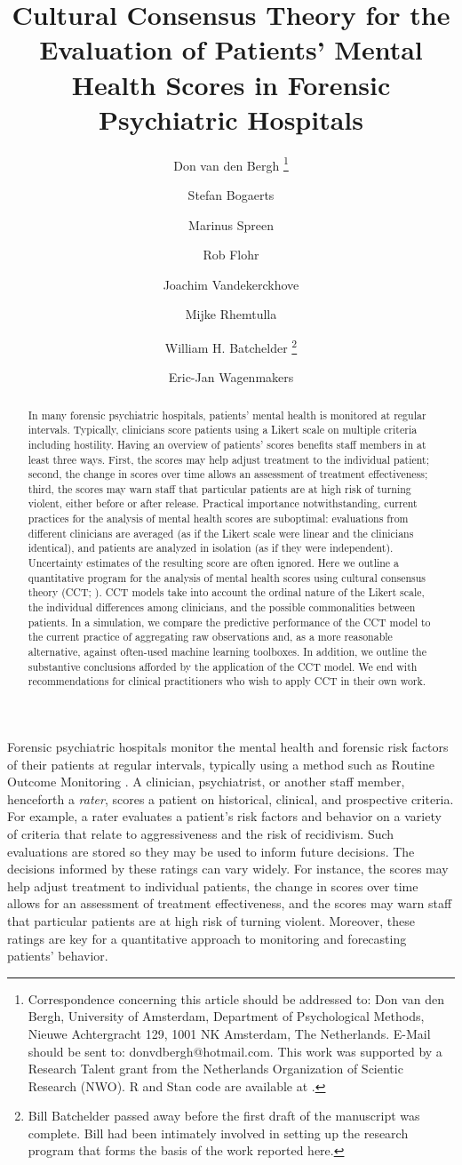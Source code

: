 \documentclass[a4paper,usenames,dvipsnames]{article}
\title{Cultural Consensus Theory for the Evaluation of Patients' Mental Health Scores in Forensic Psychiatric Hospitals}
\author[1]{Don van den Bergh%
\thanks{Correspondence concerning this article should be addressed to: Don van den Bergh, University of Amsterdam, Department of Psychological Methods, Nieuwe Achtergracht 129, 1001 NK Amsterdam, The Netherlands. E-Mail should be sent to: donvdbergh@hotmail.com. This work was supported by a Research Talent grant from the Netherlands Organization of Scientic Research (NWO). R and Stan code are available at \osflink{}.
}}
\author[2]{Stefan Bogaerts}
\author[3]{Marinus Spreen}
\author[3]{\authorcr Rob Flohr}
\author[4]{Joachim Vandekerckhove}
\author[5]{Mijke Rhemtulla}
\author[4]{\authorcr William H. Batchelder%
\thanks{Bill Batchelder passed away before the first draft of the manuscript was complete. Bill had been intimately involved in setting up the research program that forms the basis of the work reported here.}}
\author[1]{Eric-Jan Wagenmakers}
\affil[1]{University of Amsterdam}
\affil[2]{University of Tilburg}
\affil[3]{NHL Stenden University of Applied Sciences}
\affil[4]{University of California Irvine}
\affil[5]{University of California Davis}
\date{}
\begin{document}
\maketitle

\begin{abstract}
In many forensic psychiatric hospitals, patients' mental health is monitored at regular intervals. Typically, clinicians score patients using a Likert scale on multiple criteria including hostility. Having an overview of patients’ scores benefits staff members in at least three ways. First, the scores may help adjust treatment to the individual patient; second, the change in scores over time allows an assessment of treatment effectiveness; third, the scores may warn staff that particular patients are at high risk of turning violent, either before or after release. Practical importance notwithstanding, current practices for the analysis of mental health scores are suboptimal: evaluations from different clinicians are averaged (as if the Likert scale were linear and the clinicians identical), and patients are analyzed in isolation (as if they were independent). Uncertainty estimates of the resulting score are often ignored. Here we outline a quantitative program for the analysis of mental health scores using cultural consensus theory (CCT; ). CCT models take into account the ordinal nature of the Likert scale, the individual differences among clinicians, and the possible commonalities between patients. In a simulation, we compare the predictive performance of the CCT model to the current practice of aggregating raw observations and, as a more reasonable alternative, against often-used machine learning toolboxes. In addition, we outline the substantive conclusions afforded by the application of the CCT model. We end with recommendations for clinical practitioners who wish to apply CCT in their own work.
\end{abstract}
\newpage

Forensic psychiatric hospitals monitor the mental health and forensic risk factors of their patients at regular intervals, typically using a method such as Routine Outcome Monitoring \cite{deBeurs2011ROM}. A clinician, psychiatrist, or another staff member, henceforth a \textit{rater}, scores a patient on historical, clinical, and prospective criteria. For example, a rater evaluates a patient's risk factors and behavior on a variety of criteria that relate to aggressiveness and the risk of recidivism. Such evaluations are stored so they may be used to inform future decisions. The decisions informed by these ratings can vary widely. For instance, the scores may help adjust treatment to individual patients, the change in scores over time allows for an assessment of treatment effectiveness, and the scores may warn staff that particular patients are at high risk of turning violent. Moreover, these ratings are key for a quantitative approach to monitoring and forecasting patients' behavior.
\end{document}
